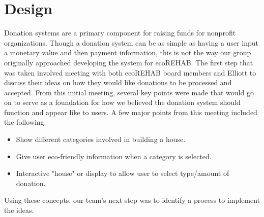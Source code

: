 \documentclass[letter]{article}
\begin{document}
\section*{Design}
Donation systems are a primary component for raising funds for
nonprofit organizations. 
Though a donation system can be as simple as
having a user input a monetary value and then payment information,
this is not the way our group originally approached developing the
system for ecoREHAB. 
The first step that was taken involved meeting
with both ecoREHAB board members 
and Elliott to discuss their ideas on
how they would like donations to be processed and accepted. From this
initial meeting, several key points were made that would go on to
serve as a foundation for how we believed the donation system should
function and appear like to users. 
A few major points from this
meeting included the following:
\begin{itemize}
	\item{Show different categories involved in building a house.}
	\item{Give user eco-friendly information when a category is selected.}
	\item{Interactive "house" or display to allow user to select type/amount of donation.}
\end{itemize}
Using these concepts, our team's next step was to identify a process to implement the ideas.
\end{document}
